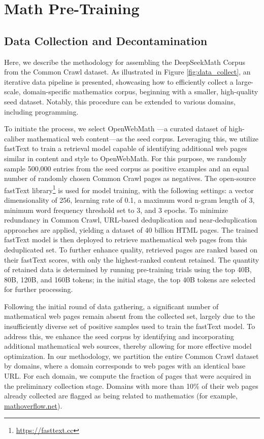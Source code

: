 \section{Math Pre-Training}

\subsection{Data Collection and Decontamination} Here, we describe the methodology for assembling the DeepSeekMath Corpus from the Common Crawl dataset. As illustrated in Figure \ref{fig:data_collect}, an iterative data pipeline is presented, showcasing how to efficiently collect a large-scale, domain-specific mathematics corpus, beginning with a smaller, high-quality seed dataset. Notably, this procedure can be extended to various domains, including programming.

To initiate the process, we select OpenWebMath \citep{openwebmath}—a curated dataset of high-caliber mathematical web content—as the seed corpus. Leveraging this, we utilize fastText \citep{joulin2016fasttext} to train a retrieval model capable of identifying additional web pages similar in content and style to OpenWebMath. For this purpose, we randomly sample 500,000 entries from the seed corpus as positive examples and an equal number of randomly chosen Common Crawl pages as negatives. The open-source fastText library\footnote{\url{https://fasttext.cc}} is used for model training, with the following settings: a vector dimensionality of 256, learning rate of 0.1, a maximum word n-gram length of 3, minimum word frequency threshold set to 3, and 3 epochs. To minimize redundancy in Common Crawl, URL-based deduplication and near-deduplication approaches are applied, yielding a dataset of 40 billion HTML pages. The trained fastText model is then deployed to retrieve mathematical web pages from this deduplicated set. To further enhance quality, retrieved pages are ranked based on their fastText scores, with only the highest-ranked content retained. The quantity of retained data is determined by running pre-training trials using the top 40B, 80B, 120B, and 160B tokens; in the initial stage, the top 40B tokens are selected for further processing.

Following the initial round of data gathering, a significant number of mathematical web pages remain absent from the collected set, largely due to the insufficiently diverse set of positive samples used to train the fastText model. To address this, we enhance the seed corpus by identifying and incorporating additional mathematical web sources, thereby allowing for more effective model optimization. In our methodology, we partition the entire Common Crawl dataset by domains, where a domain corresponds to web pages with an identical base URL. For each domain, we compute the fraction of pages that were acquired in the preliminary collection stage. Domains with more than 10\% of their web pages already collected are flagged as being related to mathematics (for example, \url{mathoverflow.net}). 

